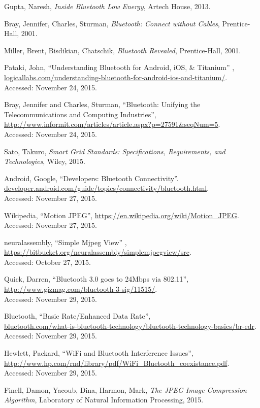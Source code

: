 \documentclass[a4paper,12pt]{article}
\begin{document}
\begin{thebibliography}{9}
Gupta, Naresh, \textit{Inside Bluetooth Low Energy}, Artech House, 2013.

Bray, Jennifer, Charles, Sturman, \textit{Bluetooth: Connect without Cables}, Prentice-Hall, 2001.

Miller, Brent, Bisdikian, Chatschik, \textit{Bluetooth Revealed}, Prentice-Hall, 2001.

Pataki, John, “Understanding Bluetooth for Android, iOS, \& Titanium” ,\\\url{logicallabs.com/understanding-bluetooth-for-android-ios-and-titanium/}.\\ Accessed: November 24, 2015.

Bray, Jennifer and Charles, Sturman, “Bluetooth: Unifying the Telecommunications and Computing Industries”,\\ \url{http://www.informit.com/articles/article.aspx?p=27591&seqNum=5}.\\ Accessed: November 24, 2015.

Sato, Takuro, \textit{Smart Grid Standards: Specifications, Requirements, and Technologies}, Wiley, 2015.

Android, Google, “Developers: Bluetooth Connectivity”. \\
\url{developer.android.com/guide/topics/connectivity/bluetooth.html}.\\ Accessed: November 27, 2015.

Wikipedia, “Motion JPEG”, \url{https://en.wikipedia.org/wiki/Motion_JPEG}.\\ Accessed: November 27, 2015.

neuralassembly, “Simple Mjpeg View” , \url{https://bitbucket.org/neuralassembly/simplemjpegview/src}.\\ Accessed: October 27, 2015.

Quick, Darren, “Bluetooth 3.0 goes to 24Mbps via 802.11”, \\\url{http://www.gizmag.com/bluetooth-3-sig/11515/}. \\Accessed: November 29, 2015.

Bluetooth, “Basic Rate/Enhanced Data Rate”, \\ \url{bluetooth.com/what-is-bluetooth-technology/bluetooth-technology-basics/br-edr}. \\ Accessed: November 29, 2015.

Hewlett, Packard, “WiFi and Bluetooth Interference Issues”, \\ \url{http://www.hp.com/rnd/library/pdf/WiFi_Bluetooth_coexistance.pdf}. \\  Accessed: November 29, 2015.

Finell, Damon, Yacoub, Dina, Harmon, Mark, \textit{The JPEG Image Compression Algorithm}, Laboratory of Natural Information Processing, 2015.

\end{thebibliography}
\end{document}
